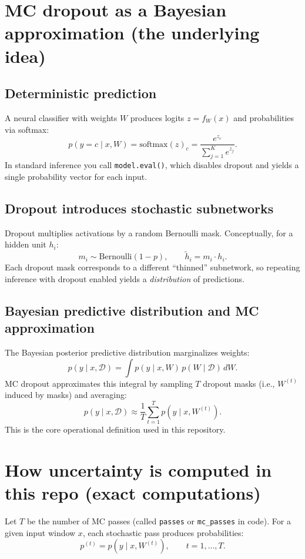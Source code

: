 \documentclass[11pt]{article}
\begin{document}
\section{MC dropout as a Bayesian approximation (the underlying idea)}

\subsection{Deterministic prediction}
A neural classifier with weights $W$ produces logits $z=f_W(x)$ and probabilities via softmax:
\[
p(y=c\mid x, W)=\mathrm{softmax}(z)_c=\frac{e^{z_c}}{\sum_{j=1}^K e^{z_j}}.
\]
In standard inference you call \texttt{model.eval()}, which disables dropout and yields a single probability vector for each input.

\subsection{Dropout introduces stochastic subnetworks}
Dropout multiplies activations by a random Bernoulli mask.
Conceptually, for a hidden unit $h_i$:
\[
m_i \sim \mathrm{Bernoulli}(1-p),\qquad \tilde{h}_i = m_i\cdot h_i.
\]
Each dropout mask corresponds to a different ``thinned'' subnetwork, so repeating inference with dropout enabled yields a \emph{distribution} of predictions.

\subsection{Bayesian predictive distribution and MC approximation}
The Bayesian posterior predictive distribution marginalizes weights:
\[
p(y\mid x,\mathcal{D})=\int p(y\mid x,W)\,p(W\mid \mathcal{D})\,dW.
\]
MC dropout approximates this integral by sampling $T$ dropout masks (i.e., $W^{(t)}$ induced by masks) and averaging:
\[
p(y\mid x,\mathcal{D})\approx \frac{1}{T}\sum_{t=1}^T p(y\mid x, W^{(t)}).
\]
This is the core operational definition used in this repository.

\section{How uncertainty is computed in this repo (exact computations)}

Let $T$ be the number of MC passes (called \texttt{passes} or \texttt{mc\_passes} in code).
For a given input window $x$, each stochastic pass produces probabilities:
\[
p^{(t)} = p(y\mid x, W^{(t)}),\qquad t=1,\dots,T.
\]
\end{document}
